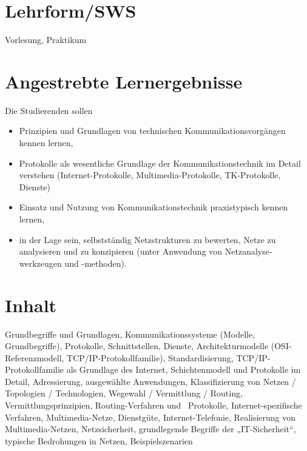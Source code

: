 \section*{Lehrform/SWS\label{/mi-2017/modulbeschreibungen-bachelor/BA_KommunikationstechnikundNetze}}\label{lehrformswspathlabelmi-2017modulbeschreibungen-bachelorbaux5fkommunikationstechnikundnetze}

Vorlesung, Praktikum

\section*{Angestrebte
Lernergebnisse\label{/mi-2017/modulbeschreibungen-bachelor/BA_KommunikationstechnikundNetze}}\label{angestrebte-lernergebnissepathlabelmi-2017modulbeschreibungen-bachelorbaux5fkommunikationstechnikundnetze}

Die Studierenden sollen

\begin{itemize}
\tightlist
\item
  Prinzipien und Grundlagen von technischen Kommunikations­vor­gängen
  kennen lernen,
\item
  Protokolle als wesentliche Grundlage der Kommunikationstechnik im
  Detail verstehen (Internet-Protokolle, Multimedia-Protokolle,
  TK-Protokolle, Dienste)
\item
  Einsatz und Nutzung von Kommunikations­tech­nik praxistypisch kennen
  lernen,
\item
  in der Lage sein, selbstständig Netzstrukturen zu bewerten, Netze zu
  analysieren und zu konzipieren (unter Anwendung von
  Netz­analyse­werkzeugen und -methoden).
\end{itemize}

\section*{Inhalt\label{/mi-2017/modulbeschreibungen-bachelor/BA_KommunikationstechnikundNetze}}\label{inhaltpathlabelmi-2017modulbeschreibungen-bachelorbaux5fkommunikationstechnikundnetze}

Grundbegriffe und Grundlagen, Kommunikationssysteme (Modelle,
Grundbegriffe), Protokolle, Schnittstellen, Dienste, Architekturmodelle
(OSI-Referenzmodell, TCP/IP-Protokollfamilie), Standardisierung,
TCP/IP-Protokollfamilie als Grundlage des Internet, Schichtenmodell und
Protokolle im Detail, Adressierung, ausgewählte Anwendungen,
Klassifizierung von Netzen / Topologien / Technologien, Wegewahl /
Vermittlung / Routing, Vermittlungsprinzipien, Routing-Verfahren und~
Protokolle, Internet-spezifische Verfahren, Multimedia-Netze,
Dienstgüte, Internet-Telefonie, Realisierung von Multimedia-Netzen,
Netzsicherheit, grundlegende Begriffe der „IT-Sicherheit``, typische
Bedrohungen in Netzen, Beispielszenarien

